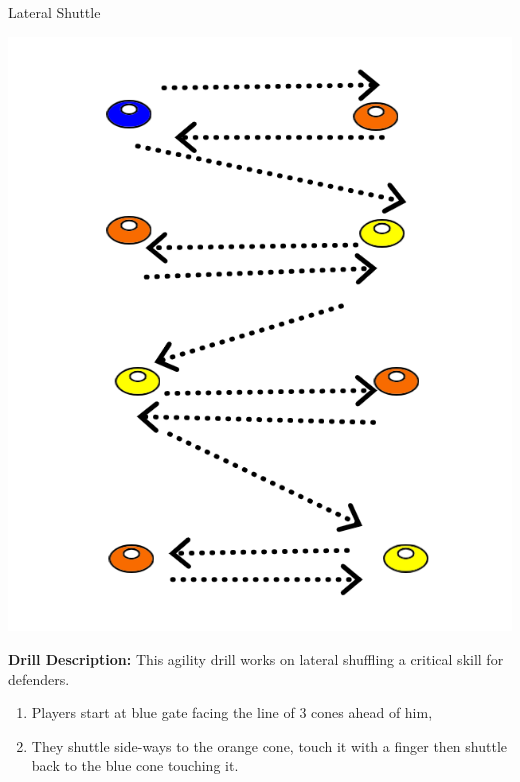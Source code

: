 
\begin{oddBlock}{Lateral Shuttle}

\begin{minipage}[t]{\linewidth}
    
    \begin{minipage}{.3\linewidth} %
        \centering
        \includegraphics[width=.6\textwidth]{../img/Trimmed/lateral_shuddle}
    \end{minipage}
    \hspace{0.05\linewidth}
    \begin{minipage}{.6\linewidth} %
        \textbf{Drill Description:}
        This agility drill works on lateral shuffling a critical skill for defenders. 
        \begin{enumerate}
            \setlength{\itemsep}{0pt}
            \setlength{\parskip}{0pt}
            \setlength{\parsep}{0pt}
            \item Players start at blue gate facing the line of 3 cones ahead of him,
            \item They shuttle side-ways to the orange cone, touch it with a finger then shuttle back to the blue cone touching it.

\end{enumerate}
\end{minipage}
\end{minipage}
\end{oddBlock}

